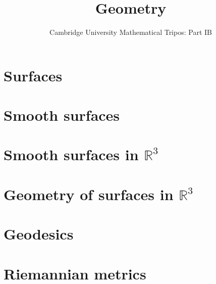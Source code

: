 \documentclass{article}
\title{Geometry}
\author{Cambridge University Mathematical Tripos: Part IB}
\begin{document}
\maketitle

\tableofcontentsnewpage{}

\section{Surfaces}

\section{Smooth surfaces}

\section{Smooth surfaces in \( \mathbb R^3 \)}

\section{Geometry of surfaces in \( \mathbb R^3 \)}

\section{Geodesics}

\section{Riemannian metrics}

\end{document}
